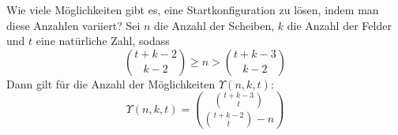 \begin{frame}{Wie viele Möglichkeiten gibt es, eine Startkonfiguration zu lösen, indem man diese Anzahlen variiert?}
    Sei $n$ die Anzahl der Scheiben, $k$ die Anzahl der Felder und $t$ eine natürliche Zahl, sodass
    \[\binom{t+k-2}{k-2}\geq n>\binom{t+k-3}{k-2}\]
    Dann gilt für die Anzahl der Möglichkeiten $\Upsilon(n,k,t)$:
    \[\Upsilon(n,k,t)=\binom{\binom{t+k-3}{t}}{\binom{t+k-2}{t}-n}\]
\end{frame}